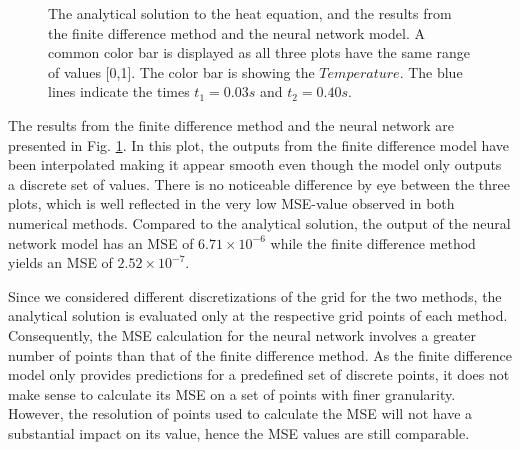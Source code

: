 \begin{figure}[h!]
    \caption{The analytical solution to the heat equation, and the results from the finite difference method and the neural network model. A common color bar is displayed as all three plots have the same range of values [0,1]. The color bar is showing the $Temperature$. The blue lines indicate the times $t_1 = 0.03 s$ and $t_2 = 0.40 s$.}
    \label{fig:heatmaps}
\end{figure}

The results from the finite difference method and the neural network are presented in Fig. \ref{fig:heatmaps}.
In this plot, the outputs from the finite difference model have been interpolated making it appear smooth even though the model only outputs a discrete set of values. 
There is no noticeable difference by eye between the three plots, which is well reflected in the very low MSE-value observed in both numerical methods. 
Compared to the analytical solution, the output of the neural network model has an MSE of $ 6.71 \times 10^{-6}$ while the finite difference method yields an MSE of $2.52 \times 10^{-7}$. 

Since we considered different discretizations of the grid for the two methods, the analytical solution is evaluated only at the respective grid points of each method. 
Consequently, the MSE calculation for the neural network involves a greater number of points than that of the finite difference method.
As the finite difference model only provides predictions for a predefined set of discrete points, it does not make sense to calculate its MSE on a set of points with finer granularity.
However, the resolution of points used to calculate the MSE will not have a substantial impact on its value, hence the MSE values are still comparable.

